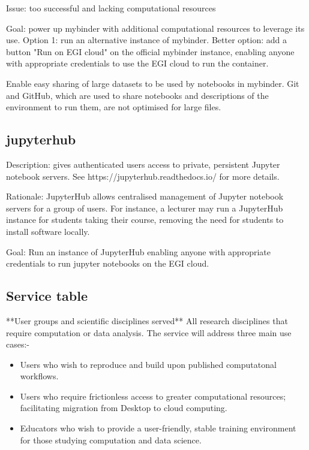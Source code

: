 Issue: too successful and lacking computational resources

Goal: power up mybinder with additional computational resources to
leverage its use. Option 1: run an alternative instance of mybinder.
Better option: add a button "Run on EGI cloud" on the official
mybinder instance, enabling anyone with appropriate credentials to use
the EGI cloud to run the container.

Enable easy sharing of large datasets to be used by notebooks in mybinder. Git
and GitHub, which are used to share notebooks and descriptions of the
environment to run them, are not optimised for large files.

\subsection{jupyterhub}

Description: gives authenticated users access to private, persistent Jupyter
notebook servers. See https://jupyterhub.readthedocs.io/ for more details.

Rationale: JupyterHub allows centralised management of Jupyter notebook servers
for a group of users. For instance, a lecturer may run a JupyterHub instance for
students taking their course, removing the need for students to install software
locally.

Goal: Run an instance of JupyterHub enabling anyone with appropriate
credentials to run jupyter notebooks on the EGI cloud.

\subsection{Service table}

**User groups and scientific disciplines served** All research disciplines that require computation or data analysis. The service will address three main use cases:-
\begin{itemize}
\item Users who wish to reproduce and build upon published computatonal workflows.
\item Users who require frictionless access to greater computational resources; facilitating migration from Desktop to cloud computing.
\item Educators who wish to provide a user-friendly, stable training environment for those studying computation and data science.
\end{itemize}


